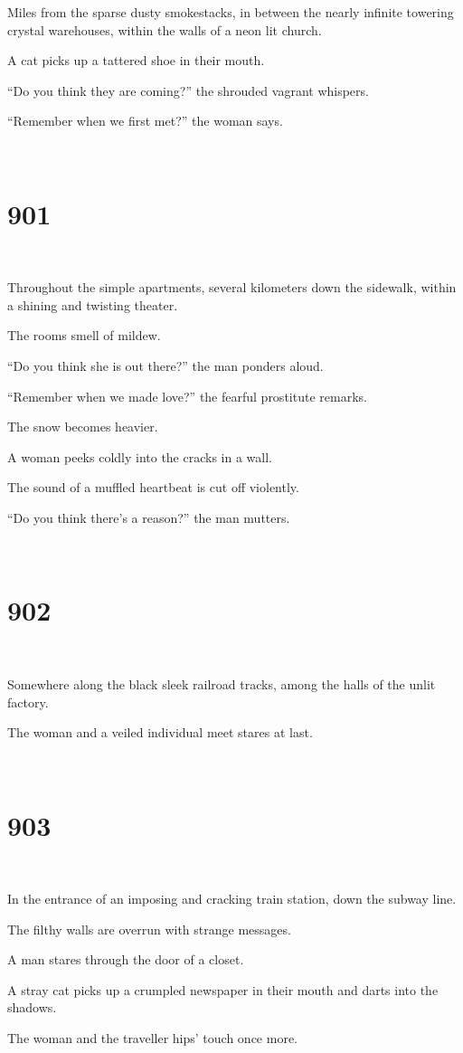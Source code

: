 \documentclass{report}
\begin{document}
Miles from the sparse dusty smokestacks, in between the nearly infinite towering crystal warehouses, within the walls of a neon lit church.

A cat picks up a tattered shoe in their mouth.

``Do you think they are coming?'' the shrouded vagrant whispers.

``Remember when we first met?'' the woman says.

~
\chapter*{901}
~

Throughout the simple apartments, several kilometers down the sidewalk, within a shining and twisting theater.

The rooms smell of mildew.

``Do you think she is out there?'' the man ponders aloud.

``Remember when we made love?'' the fearful prostitute remarks.

The snow becomes heavier.

A woman peeks coldly into the cracks in a wall.

The sound of a muffled heartbeat is cut off violently.

``Do you think there's a reason?'' the man mutters.

~
\chapter*{902}
~

Somewhere along the black sleek railroad tracks, among the halls of the unlit factory.

The woman and a veiled individual meet stares at last.

~
\chapter*{903}
~

In the entrance of an imposing and cracking train station, down the subway line.

The filthy walls are overrun with strange messages.

A man stares through the door of a closet.

A stray cat picks up a crumpled newspaper in their mouth and darts into the shadows.

The woman and the traveller hips' touch once more.
\end{document}
